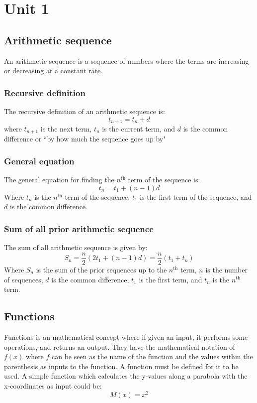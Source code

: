 \documentclass{report}
\newenvironment{desc}{\begin{center}}{\end{center}}
\begin{document}
\pagebreak

\chapter{Unit 1}
\section{Arithmetic sequence}
\begin{desc}
	An arithmetic sequence is a sequence of numbers where the terms are increasing or decreasing at a constant rate.
\end{desc}
\subsection{Recursive definition}
The recursive definition of an arithmetic sequence is:
$$
	t_{n + 1} = t_n + d
$$
where $t_{n + 1}$ is the next term, $t_n$ is the current term, and $d$ is the common difference or ``by how much the sequence goes up by"

\subsection{General equation}
The general equation for finding the $n^{\text{th}}$ term of the sequence is:
$$
	t_n = t_1 + (n - 1)d
$$
Where $t_n$ is the $n^{\text{th}}$ term of the sequence, $t_1$ is the first term of the sequence, and $d$ is the common difference.

\subsection{Sum of all prior arithmetic sequence}
The sum of all arithmetic sequence is given by:
$$
	S_n = \frac{n}{2}(2t_1 + (n - 1)d) = \frac{n}{2}(t_1 + t_n)
$$
Where $S_n$ is the sum of the prior sequences up to the $n^{\text{th}}$ term, $n$ is the number of sequences, $d$ is the common difference, $t_1$ is the first term, and $t_n$ is the $n^{\text{th}}$ term.

\section{Functions}
Functions is an mathematical concept where if given an input, it performs some operations, and returns an output.  They have the mathematical notation of $f(x)$ where $f$ can be seen as the name of the function and the values within the parenthesis as inputs to the function.  A function must be defined for it to be used.  A simple function which calculates the y-values along a parabola with the x-coordinates as input could be:
$$M(x) = x^2$$
\end{document}
